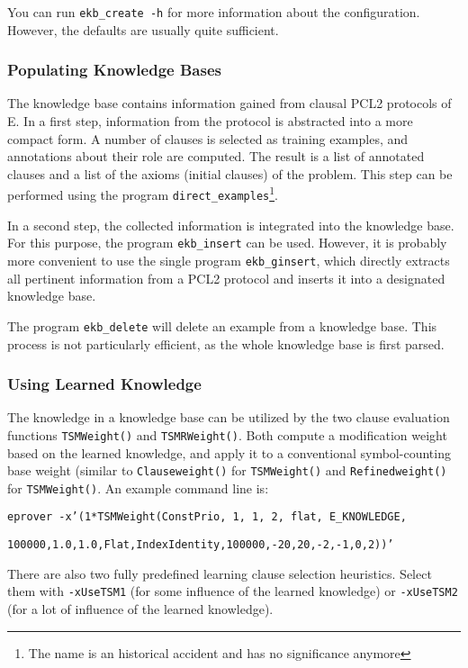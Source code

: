 \documentclass{report}
\begin{document}
You can run \texttt{ekb\_create -h} for more information about the
configuration. However, the defaults are usually quite sufficient.


\subsubsection{Populating Knowledge Bases}

The knowledge base contains information gained from clausal PCL2
protocols of E. In a first step, information from the protocol is
abstracted into a more compact form. A number of clauses is selected
as training examples, and annotations about their role are computed.
The result is a list of annotated clauses and a list of the axioms
(initial clauses) of the problem. This step can be performed using the
program \texttt{direct\_examples}\footnote{The name is an historical
  accident and has no significance anymore}.

In a second step, the collected information is integrated into the
knowledge base. For this purpose, the program \texttt{ekb\_insert}
can be used. However, it is probably more convenient to use the single
program \texttt{ekb\_ginsert}, which directly extracts all pertinent
information from a PCL2 protocol and inserts it into a designated
knowledge base.

The program \texttt{ekb\_delete} will delete an example from a
knowledge base. This process is not particularly efficient, as the
whole knowledge base is first parsed.


\subsubsection{Using Learned Knowledge}

The knowledge in a knowledge base can be utilized by the two clause
evaluation functions \texttt{TSMWeight()} and \texttt{TSMRWeight()}.
Both compute a modification weight based on the learned knowledge, and
apply it to a conventional symbol-counting base weight (similar to
\texttt{Clauseweight()} for \texttt{TSMWeight()} and
\texttt{Refinedweight()} for \texttt{TSMWeight()}. An example command
line is:

\texttt{eprover -x'(1*TSMWeight(ConstPrio, 1, 1, 2, flat,
  E\_KNOWLEDGE,}

\texttt{100000,1.0,1.0,Flat,IndexIdentity,100000,-20,20,-2,-1,0,2))'}

There are also two fully predefined learning clause selection
heuristics. Select them with \texttt{-xUseTSM1} (for some influence of
the learned knowledge) or \texttt{-xUseTSM2} (for a lot of influence
of the learned knowledge).
\end{document}
